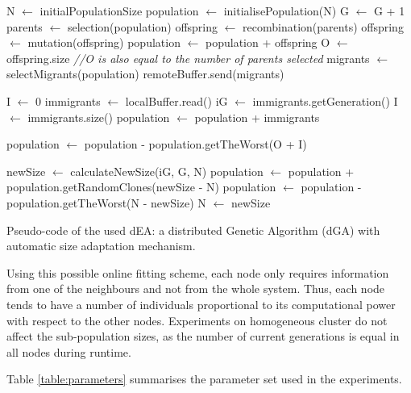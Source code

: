 \documentclass[final,1p,times]{elsarticle}
\begin{document}
\begin{algorithm}[htb]

\begin{algorithmic}
\STATE N $\gets$ initialPopulationSize
\STATE population $\gets$ initialisePopulation(N)
    \STATE G $\gets$ G + 1
    \STATE parents $\gets$ selection(population)
    \STATE offspring $\gets$ recombination(parents)
    \STATE offspring $\gets$ mutation(offspring)
    \STATE population $\gets$ population + offspring
    \STATE O $\gets$ offspring.size {\em //O is also equal to the number of parents selected}
      \STATE migrants $\gets$ selectMigrants(population)
      \STATE remoteBuffer.send(migrants)
    \ENDIF

    \STATE I $\gets$ 0
      \STATE immigrants $\gets$ localBuffer.read()
      \STATE iG $\gets$ immigrants.getGeneration()
      \STATE I $\gets$ immigrants.size()
      \STATE population $\gets$ population + immigrants
    \ENDIF

    \STATE population $\gets$ population - population.getTheWorst(O + I)

    \STATE newSize $\gets$ calculateNewSize(iG, G, N)
        \STATE population $\gets$ population + population.getRandomClones(newSize - N)
    \ELSE
        \STATE population $\gets$ population - population.getTheWorst(N - newSize)
    \ENDIF
    \STATE N $\gets$ newSize
\ENDWHILE

\end{algorithmic}
\caption{Pseudo-code of the used dEA: a distributed Genetic Algorithm (dGA) with automatic size adaptation mechanism.}
\label{alg:EAadaptive}
\end{algorithm}

Using this possible online fitting scheme, each node only requires  information from one of the neighbours and not from the whole system. Thus, each node tends to have a number of individuals proportional to its computational power with respect to the other nodes. Experiments on homogeneous cluster do not affect the sub-population sizes, as the number of current generations is equal in all nodes during runtime.

Table \ref{table:parameters} summarises  the parameter set used in the experiments.
\end{document}
